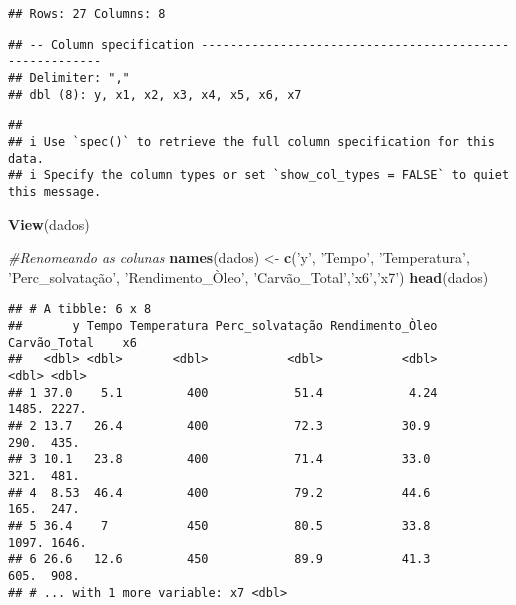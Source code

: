 \documentclass[
]{article}
\newenvironment{Shaded}{\begin{snugshade}}{\end{snugshade}}
\newcommand{\CommentTok}[1]{\textcolor[rgb]{0.56,0.35,0.01}{\textit{#1}}}
\newcommand{\KeywordTok}[1]{\textcolor[rgb]{0.13,0.29,0.53}{\textbf{#1}}}
\newcommand{\NormalTok}[1]{#1}
\newcommand{\StringTok}[1]{\textcolor[rgb]{0.31,0.60,0.02}{#1}}
\begin{document}
\begin{verbatim}
## Rows: 27 Columns: 8
\end{verbatim}

\begin{verbatim}
## -- Column specification --------------------------------------------------------
## Delimiter: ","
## dbl (8): y, x1, x2, x3, x4, x5, x6, x7
\end{verbatim}

\begin{verbatim}
## 
## i Use `spec()` to retrieve the full column specification for this data.
## i Specify the column types or set `show_col_types = FALSE` to quiet this message.
\end{verbatim}

\begin{Shaded}
\begin{Highlighting}[]
\KeywordTok{View}\NormalTok{(dados)}
\end{Highlighting}
\end{Shaded}

\begin{Shaded}
\begin{Highlighting}[]
\CommentTok{#Renomeando as colunas}
\KeywordTok{names}\NormalTok{(dados) <-}\StringTok{ }\KeywordTok{c}\NormalTok{(}\StringTok{'y'}\NormalTok{, }\StringTok{'Tempo'}\NormalTok{, }\StringTok{'Temperatura'}\NormalTok{, }\StringTok{'Perc_solvatação'}\NormalTok{, }\StringTok{'Rendimento_Òleo'}\NormalTok{, }\StringTok{'Carvão_Total'}\NormalTok{,}\StringTok{'x6'}\NormalTok{,}\StringTok{'x7'}\NormalTok{)}
\KeywordTok{head}\NormalTok{(dados)}
\end{Highlighting}
\end{Shaded}

\begin{verbatim}
## # A tibble: 6 x 8
##       y Tempo Temperatura Perc_solvatação Rendimento_Òleo Carvão_Total    x6
##   <dbl> <dbl>       <dbl>           <dbl>           <dbl>        <dbl> <dbl>
## 1 37.0    5.1         400            51.4            4.24        1485. 2227.
## 2 13.7   26.4         400            72.3           30.9          290.  435.
## 3 10.1   23.8         400            71.4           33.0          321.  481.
## 4  8.53  46.4         400            79.2           44.6          165.  247.
## 5 36.4    7           450            80.5           33.8         1097. 1646.
## 6 26.6   12.6         450            89.9           41.3          605.  908.
## # ... with 1 more variable: x7 <dbl>
\end{verbatim}
\end{document}
